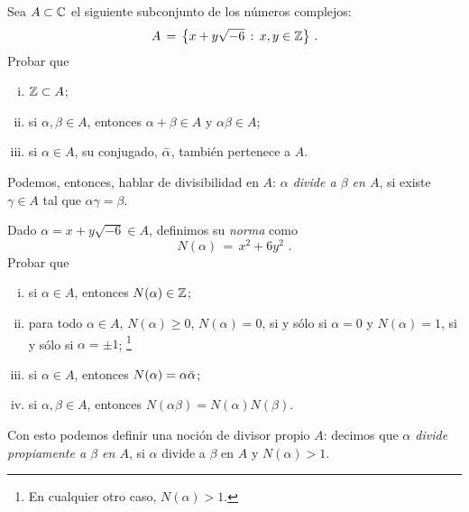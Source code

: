 \begin{ejerPrimos}\label{ejer:primos:factorizacion:cuadratico}
	Sea $A\subset\mathbb{C}$ el siguiente subconjunto de los n\'umeros
	complejos:
	\begin{displaymath}
		A \,=\,\big\{x+y\sqrt{-6}\,:\,x,y\in\mathbb{Z}\big\}
		\text{ .}
	\end{displaymath}
	Probar que
	\begin{enumerate}[(i)]
		\item\label{item:ejer:primos:cuadratico:enteros}
			$\mathbb{Z}\subset A$;
		\item\label{item:ejer:primos:cuadratico:anillo}
			si $\alpha,\beta\in A$, entonces
			$\alpha+\beta\in A$ y $\alpha\beta\in A$;
		\item\label{item:ejer:primos:cuadratico:conjugado}
			si $\alpha\in A$, su conjugado, $\bar{\alpha}$,
			tambi\'en pertenece a $A$.
	\end{enumerate}
	Podemos, entonces, hablar de divisibilidad en $A$:
	\emph{$\alpha$ divide a $\beta$ en $A$}, si existe $\gamma\in A$ tal
	que $\alpha\gamma=\beta$.

	Dado $\alpha=x+y\sqrt{-6}\in A$, definimos su \emph{norma} como
	\begin{displaymath}
		N(\alpha)\,=\,x^2+6y^2
		\text{ .}
	\end{displaymath}
	Probar que
	\begin{enumerate}[(i)]
		\item\label{item:ejer:primos:cuadratico:norma:entera}
			si $\alpha\in A$, entonces $N(\alpha)\in\mathbb{Z}$;
		\item\label{item:ejer:primos:norma:no-negativa-cero-y-unidades}
			para todo $\alpha\in A$, $N(\alpha)\geq 0$,
			$N(\alpha)=0$, si y s\'olo si $\alpha=0$ y
			$N(\alpha)=1$, si y s\'olo si $\alpha=\pm 1$;%
			\footnote{
				En cualquier otro caso, $N(\alpha)>1$.
			}
		\item\label{item:ejer:primos:cuadratico:norma:bis}
			si $\alpha\in A$, entonces
			$N(\alpha)=\alpha\bar{\alpha}$;
		\item\label{item:ejer:primos:cuadratico:norma:multiplicativa}
			si $\alpha,\beta\in A$, entonces
			$N(\alpha\beta)=N(\alpha)N(\beta)$.
	\end{enumerate}
	Con esto podemos definir una noci\'on de divisor propio $A$:
	decimos que \emph{$\alpha$ divide propiamente a $\beta$ en $A$},
	si $\alpha$ divide a $\beta$ en $A$ y $N(\alpha)>1$.


\end{ejerPrimos}

